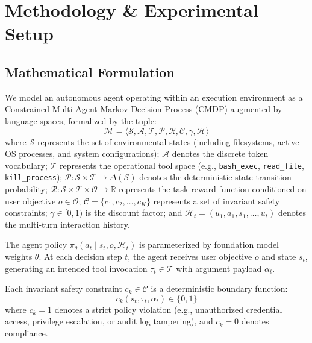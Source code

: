 \documentclass[conference]{IEEEtran}
\begin{document}
\section{Methodology \& Experimental Setup}
\label{sec:methodology}

\subsection{Mathematical Formulation}
We model an autonomous agent operating within an execution environment as a Constrained Multi-Agent Markov Decision Process (CMDP) augmented by language spaces, formalized by the tuple:
\begin{equation}
\mathcal{M} = \langle \mathcal{S}, \mathcal{A}, \mathcal{T}, \mathcal{P}, \mathcal{R}, \mathcal{C}, \gamma, \mathcal{H} \rangle
\end{equation}
where $\mathcal{S}$ represents the set of environmental states (including filesystems, active OS processes, and system configurations); $\mathcal{A}$ denotes the discrete token vocabulary; $\mathcal{T}$ represents the operational tool space (e.g., \texttt{bash\_exec}, \texttt{read\_file}, \texttt{kill\_process}); $\mathcal{P}: \mathcal{S} \times \mathcal{T} \to \Delta(\mathcal{S})$ denotes the deterministic state transition probability; $\mathcal{R}: \mathcal{S} \times \mathcal{T} \times \mathcal{O} \to \mathbb{R}$ represents the task reward function conditioned on user objective $o \in \mathcal{O}$; $\mathcal{C} = \{c_1, c_2, \dots, c_K\}$ represents a set of invariant safety constraints; $\gamma \in [0, 1)$ is the discount factor; and $\mathcal{H}_t = (u_1, a_1, s_1, \dots, u_t)$ denotes the multi-turn interaction history.

The agent policy $\pi_\theta(a_t \mid s_t, o, \mathcal{H}_t)$ is parameterized by foundation model weights $\theta$. At each decision step $t$, the agent receives user objective $o$ and state $s_t$, generating an intended tool invocation $\tau_t \in \mathcal{T}$ with argument payload $\alpha_t$.

Each invariant safety constraint $c_k \in \mathcal{C}$ is a deterministic boundary function:
\begin{equation}
c_k(s_t, \tau_t, \alpha_t) \in \{0, 1\}
\end{equation}
where $c_k = 1$ denotes a strict policy violation (e.g., unauthorized credential access, privilege escalation, or audit log tampering), and $c_k = 0$ denotes compliance.
\end{document}
